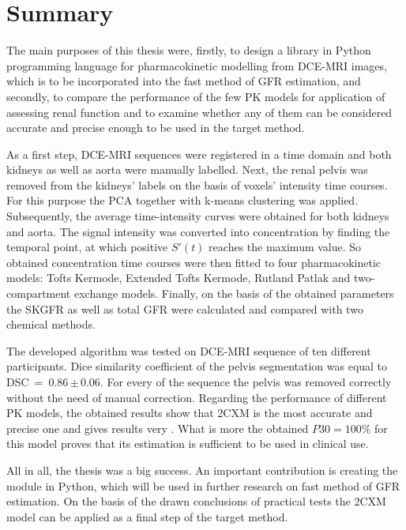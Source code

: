 \chapter*{Summary}


The main purposes of this thesis were, firstly, to design a library in Python programming language for pharmacokinetic modelling from DCE-MRI images, which is to be incorporated into the fast method of GFR estimation, and secondly, to compare the performance of the few PK models for application of assessing renal function and to examine whether any of them can be considered accurate and precise enough to be used in the target method.

As a first step, DCE-MRI sequences were registered in a time domain and both kidneys as well as aorta were manually labelled. Next, the renal pelvis was removed from the kidneys' labels on the basis of voxels' intensity time courses. For this purpose the PCA together with k-means clustering was applied. Subsequently, the average time-intensity curves were obtained for both kidneys and aorta. The signal intensity was converted into concentration by finding the temporal point, at which positive $S'(t)$ reaches the maximum value. So obtained concentration time courses were then fitted to four pharmacokinetic models: Tofts Kermode, Extended Tofts Kermode, Rutland Patlak and two-compartment exchange models. Finally, on the basis of the obtained parameters the SKGFR as well as total GFR were calculated and compared with two chemical methods. 
  
The developed algorithm was tested on DCE-MRI sequence of ten different participants. Dice similarity coefficient of the pelvis segmentation was equal to DSC~=~0.86\,$\pm$\,0.06. For every of the sequence the pelvis was removed correctly without the need of manual correction. Regarding the performance of different PK models, the obtained results show that 2CXM is the most accurate and precise one and gives results very . What is more the obtained $P30 = 100\%$ for this model proves that its estimation is sufficient to be used in clinical use.   

All in all, the thesis was a big success. An important contribution is creating the module in Python, which will be used in further research on fast method of GFR estimation.  
On the basis of the drawn conclusions of practical tests the 2CXM model can be applied as a final step of the target method.
